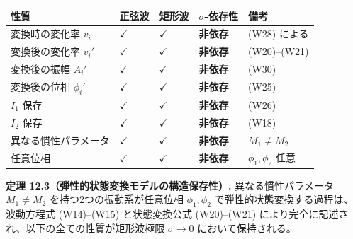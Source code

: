 \documentclass[a4paper,11pt]{ltjsarticle}
\newcounter{none}
\begin{document}
{\def\LTcaptype{none} %
\begin{longtable}[]{@{}
  >{\centering\arraybackslash}p{}
  >{\centering\arraybackslash}p{}
  >{\centering\arraybackslash}p{}
  >{\centering\arraybackslash}p{}
  >{\centering\arraybackslash}p{}@{}}
\toprule\noalign{}
\begin{minipage}[b]{\linewidth}\centering
性質
\end{minipage} & \begin{minipage}[b]{\linewidth}\centering
正弦波
\end{minipage} & \begin{minipage}[b]{\linewidth}\centering
矩形波
\end{minipage} & \begin{minipage}[b]{\linewidth}\centering
\(\sigma\)-依存性
\end{minipage} & \begin{minipage}[b]{\linewidth}\centering
備考
\end{minipage} \\
\midrule\noalign{}
\endhead
\bottomrule\noalign{}
\endlastfoot
変換時の変化率 \(v_i\) & \(\checkmark\) & \(\checkmark\) &
\textbf{非依存} & (W28) による \\
変換後の変化率 \(v_i'\) & \(\checkmark\) & \(\checkmark\) &
\textbf{非依存} & (W20)--(W21) \\
変換後の振幅 \(A_i'\) & \(\checkmark\) & \(\checkmark\) &
\textbf{非依存} & (W30) \\
変換後の位相 \(\phi_i'\) & \(\checkmark\) & \(\checkmark\) &
\textbf{非依存} & (W25) \\
\(I_1\) 保存 & \(\checkmark\) & \(\checkmark\) & \textbf{非依存} &
(W26) \\
\(I_2\) 保存 & \(\checkmark\) & \(\checkmark\) & \textbf{非依存} &
(W18) \\
異なる慣性パラメータ & \(\checkmark\) & \(\checkmark\) & \textbf{非依存}
& \(M_1 \neq M_2\) \\
任意位相 & \(\checkmark\) & \(\checkmark\) & \textbf{非依存} &
\(\phi_1, \phi_2\) 任意 \\
\end{longtable}
}

\textbf{定理 12.3（弾性的状態変換モデルの構造保存性）.}
異なる慣性パラメータ \(M_1 \neq M_2\) を持つ2つの振動系が任意位相
\(\phi_1, \phi_2\) で弾性的状態変換する過程は、波動方程式 (W14)--(W15)
と状態変換公式 (W20)--(W21)
により完全に記述され、以下の全ての性質が矩形波極限 \(\sigma \to 0\)
において保持される。
\end{document}
